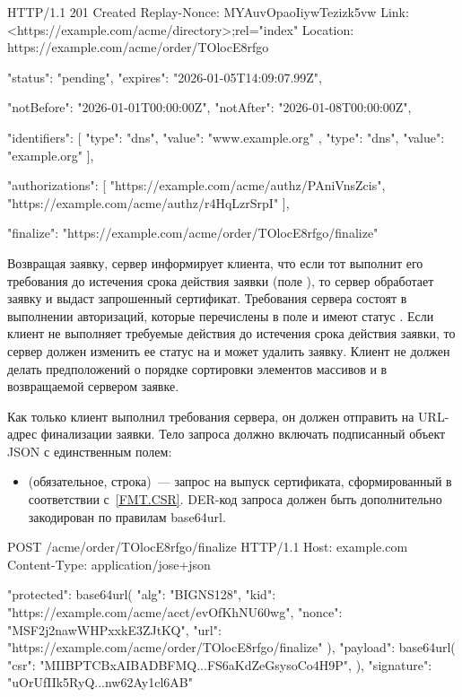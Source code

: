 \begin{codeblock}
HTTP/1.1 201 Created
Replay-Nonce: MYAuvOpaoIiywTezizk5vw
Link: <https://example.com/acme/directory>;rel="index"
Location: https://example.com/acme/order/TOlocE8rfgo

{
  "status": "pending",
  "expires": "2026-01-05T14:09:07.99Z",

  "notBefore": "2026-01-01T00:00:00Z",
  "notAfter": "2026-01-08T00:00:00Z",

  "identifiers": [
    { "type": "dns", "value": "www.example.org" },
    { "type": "dns", "value": "example.org" }
  ],

  "authorizations": [
    "https://example.com/acme/authz/PAniVnsZcis",
    "https://example.com/acme/authz/r4HqLzrSrpI"
  ],

  "finalize": "https://example.com/acme/order/TOlocE8rfgo/finalize"
} 
\end{codeblock}
\fi

Возвращая заявку, сервер информирует клиента, что если тот выполнит его
требования до истечения срока действия заявки (поле ), 
то сервер обработает заявку и выдаст запрошенный сертификат. 
%
Требования сервера состоят в выполнении авторизаций, которые перечислены
в поле  и имеют статус .
%
Если клиент не выполняет требуемые действия до истечения срока действия заявки, 
то сервер должен изменить ее статус на  и может удалить заявку.
%
Клиент не должен делать предположений о порядке сортировки элементов 
массивов  и  в возвращаемой сервером
заявке.  

Как только клиент выполнил требования сервера, он должен отправить 
 на URL-адрес финализации заявки. Тело 
запроса должно включать подписанный объект JSON с единственным полем: 

\begin{itemize}
\item
{} (обязательное, строка)~--- запрос на выпуск сертификата, 
сформированный в соответствии с~\ref{FMT.CSR}. DER-код запроса должен
быть дополнительно закодирован по правилам base64url.
\end{itemize}

\begin{codeblock}
POST /acme/order/TOlocE8rfgo/finalize HTTP/1.1
Host: example.com
Content-Type: application/jose+json

{
  "protected": base64url({
    "alg": "BIGNS128",
    "kid": "https://example.com/acme/acct/evOfKhNU60wg",
    "nonce": "MSF2j2nawWHPxxkE3ZJtKQ",
    "url": "https://example.com/acme/order/TOlocE8rfgo/finalize"
  }),
  "payload": base64url({
    "csr": "MIIBPTCBxAIBADBFMQ...FS6aKdZeGsysoCo4H9P",
  }),
  "signature": "uOrUfIIk5RyQ...nw62Ay1cl6AB"
}
\end{codeblock}
\fi

